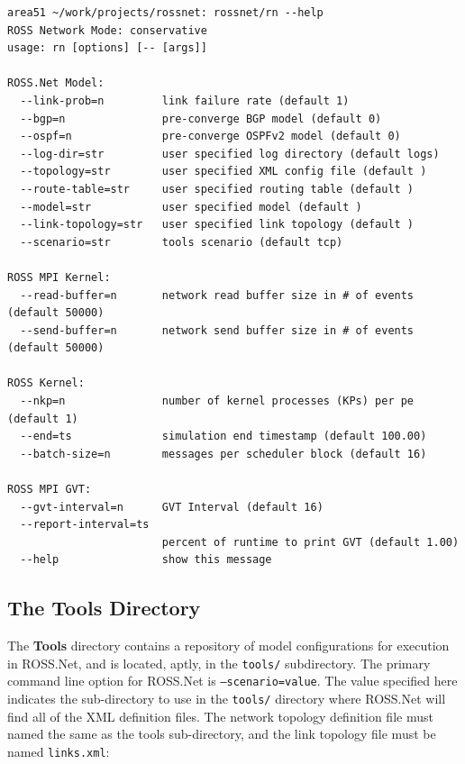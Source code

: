 \documentclass[conference,onecolumn]{IEEEtran}
\begin{document}
\begin{small}
\begin{small}\begin{verbatim}
area51 ~/work/projects/rossnet: rossnet/rn --help
ROSS Network Mode: conservative
usage: rn [options] [-- [args]]

ROSS.Net Model:
  --link-prob=n         link failure rate (default 1)
  --bgp=n               pre-converge BGP model (default 0)
  --ospf=n              pre-converge OSPFv2 model (default 0)
  --log-dir=str         user specified log directory (default logs)
  --topology=str        user specified XML config file (default )
  --route-table=str     user specified routing table (default )
  --model=str           user specified model (default )
  --link-topology=str   user specified link topology (default )
  --scenario=str        tools scenario (default tcp)

ROSS MPI Kernel:
  --read-buffer=n       network read buffer size in # of events (default 50000)
  --send-buffer=n       network send buffer size in # of events (default 50000)

ROSS Kernel:
  --nkp=n               number of kernel processes (KPs) per pe (default 1)
  --end=ts              simulation end timestamp (default 100.00)
  --batch-size=n        messages per scheduler block (default 16)

ROSS MPI GVT:
  --gvt-interval=n      GVT Interval (default 16)
  --report-interval=ts
                        percent of runtime to print GVT (default 1.00)
  --help                show this message
\end{verbatim}\end{small}
\end{small}

\subsection{The Tools Directory}

The {\bf Tools} directory contains a repository of model configurations for execution in ROSS.Net, and is located, aptly, in the {\tt tools/} subdirectory.  The primary command line option for ROSS.Net is {\tt --scenario=value}.  The value specified here indicates the sub-directory to use in the {\tt tools/} directory where ROSS.Net will find all of the XML definition files.  The network topology definition file must named the same as the tools sub-directory, and the link topology file must be named {\tt links.xml}:
\end{document}
